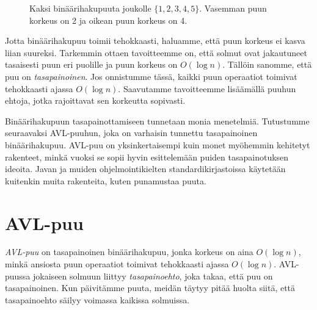 \begin{figure}
\center
{}
\caption{Kaksi binäärihakupuuta joukolle $\{1,2,3,4,5\}$.
Vasemman puun korkeus on 2 ja oikean puun korkeus on 4.}
\label{fig:bihkor}
\end{figure}

Jotta binäärihakupuu toimii tehokkaasti, haluamme,
että puun korkeus ei kasva liian suureksi.
Tarkemmin ottaen tavoitteemme on, että
solmut ovat jakautuneet tasaisesti puun eri puolille
ja puun korkeus on $O(\log n)$.
Tällöin sanomme, että puu on \emph{tasapainoinen}.
Jos onnistumme tässä, kaikki puun operaatiot toimivat
tehokkaasti ajassa $O(\log n)$.
Saavutamme tavoitteemme
lisäämällä puuhun ehtoja, jotka rajoittavat
sen korkeutta sopivasti.

Binäärihakupuun tasapainottamiseen tunnetaan monia menetelmiä.
Tutustumme seuraavaksi AVL-puuhun, joka on 
varhaisin tunnettu tasapainoinen binäärihakupuu.
AVL-puu on yksinkertaisempi kuin monet myöhemmin
kehitetyt rakenteet, minkä vuoksi se sopii hyvin esittelemään
puiden tasapainotuksen ideoita.
Javan ja muiden ohjelmointikielten standardikirjastoissa
käyte\-tään kuitenkin muita rakenteita, kuten punamustaa puuta.

\section{AVL-puu}

\emph{AVL-puu} on tasapainoinen binäärihakupuu, jonka
korkeus on aina $O(\log n)$, minkä ansiosta puun operaatiot
toimivat tehokkaasti ajassa $O(\log n)$.
AVL-puussa jokaiseen solmuun liittyy \emph{tasapainoehto},
joka takaa, että puu on tasapainoinen.
Kun päivitämme puuta, meidän täytyy pitää huolta siitä,
että tasapainoehto säilyy voimassa kaikissa solmuissa.

